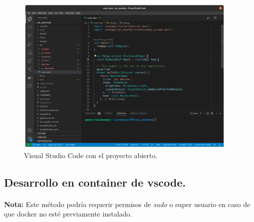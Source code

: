 \begin{figure}[H]
    \centering
    \includegraphics[width=0.95\textwidth]{imgs/vscode-ready}
	\caption[Visual Studio Code]{Visual Studio Code con el proyecto abierto.}
	\label{imgs:vscode-ready}
\end{figure}

\subsection{Desarrollo en container de vscode.}

\paragraph{}\textbf{Nota:} Este método podría requerir permisos de \emph{sudo} o super
usuario en caso de que docker no esté previamente instalado.

